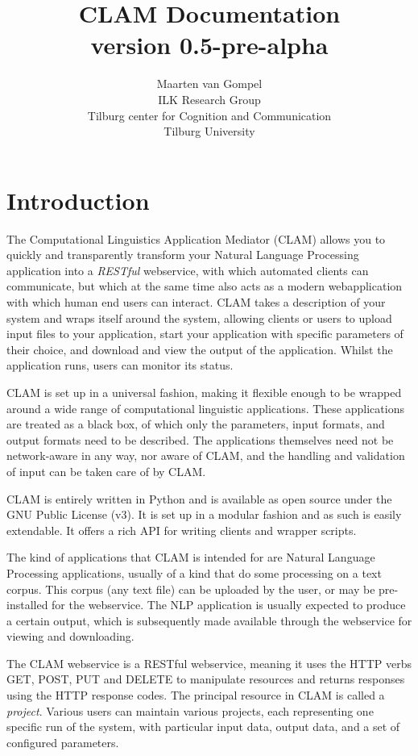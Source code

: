 \documentclass[a4paper,12pt]{report}
\title{CLAM Documentation \\ \small version 0.5-pre-alpha}
\author{Maarten van Gompel \\ ILK Research Group \\ Tilburg center for Cognition and Communication \\ Tilburg University }
\begin{document}
\sffamily

\maketitle
\tableofcontents

\chapter{Introduction} 

The Computational Linguistics Application Mediator (CLAM) allows you to quickly and transparently transform your Natural Language Processing application into a \emph{RESTful}\/ webservice, with which automated clients can communicate, but which at the same time also acts as a modern webapplication with which human end users can interact. CLAM takes a description of your system and wraps itself around the system, allowing clients or users to upload input files to your application, start your application with specific parameters of their choice, and download and view the output of the application. Whilst the application runs, users can monitor its status.

CLAM is set up in a universal fashion, making it flexible enough to be wrapped around a wide range of computational linguistic applications. These applications are treated as a black box, of which only the parameters, input formats, and output formats need to be described. The applications themselves need not be network-aware in any way, nor aware of CLAM, and the handling and validation of input can be taken care of by CLAM.

CLAM is entirely written in Python and is available as open source under the GNU Public License (v3). It is set up in a modular fashion and as such is easily extendable. It offers a rich API for writing clients and wrapper scripts.

The kind of applications that CLAM is intended for are Natural Language Processing applications, usually of a kind that do some processing on a text corpus. This corpus (any text file) can be uploaded by the user, or may be pre-installed for the webservice. The NLP application is usually expected to produce a certain output, which is subsequently made available through the webservice for viewing and downloading.

The CLAM webservice is a RESTful webservice, meaning it uses the HTTP verbs GET, POST, PUT and DELETE to manipulate resources and returns responses using the HTTP response codes. The principal resource in CLAM is called a \emph{project}. Various users can maintain various projects, each representing one specific run of the system, with particular input data, output data, and a set of configured parameters.
\end{document}
